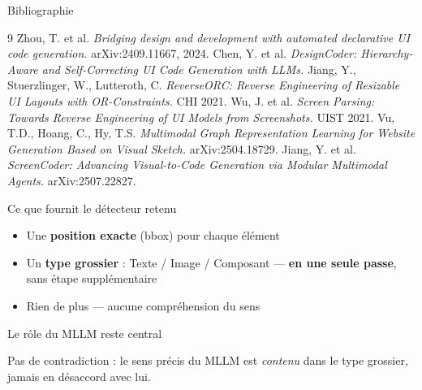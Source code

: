 \documentclass[11pt,aspectratio=169]{beamer}
\begin{document}
\begin{frame}[allowframebreaks]{Bibliographie}
  \small
  \begin{thebibliography}{9}
   Zhou, T. et al. \textit{Bridging design and development with automated declarative UI code generation.} arXiv:2409.11667, 2024.
   Chen, Y. et al. \textit{DesignCoder: Hierarchy-Aware and Self-Correcting UI Code Generation with LLMs.}
   Jiang, Y., Stuerzlinger, W., Lutteroth, C. \textit{ReverseORC: Reverse Engineering of Resizable UI Layouts with OR-Constraints.} CHI 2021.
   Wu, J. et al. \textit{Screen Parsing: Towards Reverse Engineering of UI Models from Screenshots.} UIST 2021.
   Vu, T.D., Hoang, C., Hy, T.S. \textit{Multimodal Graph Representation Learning for Website Generation Based on Visual Sketch.} arXiv:2504.18729.
   Jiang, Y. et al. \textit{ScreenCoder: Advancing Visual-to-Code Generation via Modular Multimodal Agents.} arXiv:2507.22827.
  \end{thebibliography}
\end{frame}

\begin{frame}{Ce que fournit le détecteur retenu}
  \begin{itemize}
    \item Une \textbf{position exacte} (bbox) pour chaque élément
    \item Un \textbf{type grossier} : Texte / Image / Composant --- \textbf{en une seule passe}, sans étape supplémentaire
    \item Rien de plus --- aucune compréhension du sens
  \end{itemize}
\end{frame}

\begin{frame}{Le rôle du MLLM reste central}
  \begin{center}
  \end{center}
  \vspace{4mm}
  \begin{center}
  \small Pas de contradiction : le sens précis du MLLM est \emph{contenu} dans le type grossier, jamais en désaccord avec lui.
  \end{center}
\end{frame}
\end{document}
